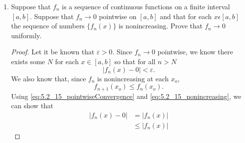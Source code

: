 \documentclass{article}
\begin{document}
\begin{enumerate}
\begin{proof}
                  \begin{equation}
                        \lvert f_N(x)-f_N(x_o)\rvert < \frac{\varepsilon}{3}
                        \text{ if } \lvert x-x_o\rvert < \delta.
                        \label{eq:5.2_7_continuous}
                  \end{equation}
                  Using \eqref{eq:5.2_7_uniformConvergence} and
                  \eqref{eq:5.2_7_continuous}, we can show that
                  \begin{align*}
                        \lvert f(x)-f(x_o)\rvert & = \lvert f_N(x)-f(x)+f_N(x)-f_N(x_o)+f_N(x_o)-f(x_o)\rvert                              \\
                                                 & \leq \lvert f_N(x)-f(x)\rvert+\lvert f_N(x)-f_N(x_o)\lvert+\rvert f_N(x_o)-f(x_o)\rvert \\
                                                 & < \frac{\varepsilon}{3} + \frac{\varepsilon}{3} + \frac{\varepsilon}{3}                 \\
                                                 & = \varepsilon.
                  \end{align*}
                  Therefore, $f$ must be continuous since $\lvert f(x)-f(x_o)\rvert<\varepsilon$.
            \end{proof}
            \setcounter{enumi}{14}
      \item Suppose that ${f_n}$ is a sequence of continuous functions on a
            finite interval $[a,b]$. Suppose that $f_n\to 0$ pointwise
            on $[a,b]$ and that for each $x\epsilon [a,b]$ the sequence of
            numbers $\{f_n(x)\}$ is nonincreasing. Prove that $f_n\to 0$
            uniformly.
            \begin{proof}
                  Let it be known that $\varepsilon>0$. Since $f_n\to 0$ pointwise,
                  we know there exists some $N$ for each $x\in[a,b]$ so that for
                  all $n>N$
                  \begin{equation}
                        \lvert f_n(x)-0\rvert<\varepsilon.
                        \label{eq:5.2_15_pointwiseConvergence}
                  \end{equation}
                  We also know that, since $f_n$ is nonincreasing at each $x_o$,
                  \begin{equation}
                        f_{n+1}(x_o) \leq f_n(x_o).
                        \label{eq:5.2_15_nonincreasing}
                  \end{equation}
                  Using \eqref{eq:5.2_15_pointwiseConvergence} and
                  \eqref{eq:5.2_15_nonincreasing}, we can show that
                  \begin{align*}
                        \lvert f_n(x)-0\rvert & = \lvert f_n(x)\rvert    \\
                                              & \leq \lvert f_n(x)\rvert
                  \end{align*}%
            \end{proof}
\end{enumerate}
\end{document}
